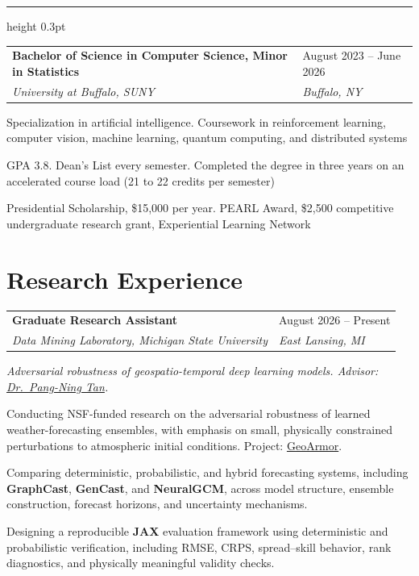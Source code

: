 \documentclass[11pt,a4paper]{article}
\makeatletter
\newcommand{\entrydivider}{%
  \vspace{4pt}%
  {\color{rulecolor}\hrule height 0.3pt}%
  \vspace{4pt}%
}
\newcommand{\roleentry}[4]{%
  \vspace{0.5em}%
  \begin{tabular*}{\textwidth}{@{\extracolsep{\fill}} ll}
    \textbf{#1} & #2 \\
    \textit{#3} & \textit{#4} \\
  \end{tabular*}%
  \vspace{0.15em}%
}
\newcommand{\scopesentence}[1]{%
  \vspace{0.15em}%
  {\itshape #1}\par
  \vspace{0.1em}%
}
\makeatother
\begin{document}
\entrydivider

\roleentry{Bachelor of Science in Computer Science, Minor in Statistics}{August 2023 -- June 2026}{University at Buffalo, SUNY}{Buffalo, NY}
\begin{cvlist}
  \item Specialization in artificial intelligence. Coursework in reinforcement learning, computer vision, machine learning, quantum computing, and distributed systems
  \item GPA 3.8. Dean's List every semester. Completed the degree in three years on an accelerated course load (21 to 22 credits per semester)
  \item Presidential Scholarship, \$15,000 per year. PEARL Award, \$2,500 competitive undergraduate research grant, Experiential Learning Network
\end{cvlist}

\section*{Research Experience}

\roleentry{Graduate Research Assistant}{August 2026 -- Present}{Data Mining Laboratory, Michigan State University}{East Lansing, MI}
\scopesentence{Adversarial robustness of geospatio-temporal deep learning models. Advisor: \href{https://www.cse.msu.edu/~ptan/}{Dr.\ Pang-Ning Tan}.}
\begin{cvlist}
  \item Conducting NSF-funded research on the adversarial robustness of learned weather-forecasting ensembles, with emphasis on small, physically constrained perturbations to atmospheric initial conditions. Project: \href{https://www.cse.msu.edu/~ptan/project/geoarmor/}{GeoArmor}.
  \item Comparing deterministic, probabilistic, and hybrid forecasting systems, including \textbf{GraphCast}, \textbf{GenCast}, and \textbf{NeuralGCM}, across model structure, ensemble construction, forecast horizons, and uncertainty mechanisms.
  \item Designing a reproducible \textbf{JAX} evaluation framework using deterministic and probabilistic verification, including RMSE, CRPS, spread--skill behavior, rank diagnostics, and physically meaningful validity checks.
\end{cvlist}
\end{document}
